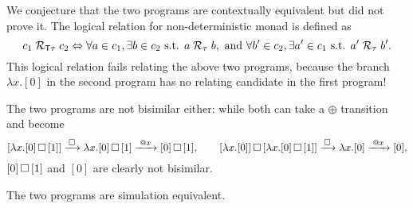 \documentclass[10pt,a4]{article}
\begin{document}
We conjecture that the two programs are contextually equivalent but did not prove it. 
The logical relation for non-deterministic monad is defined as 
\[
c_1 \;\mathcal{R}_{\mathsf{T} \tau}\; c_2 
\Leftrightarrow 
\forall a \in c_1, \exists b \in c_2 \mbox{ s.t. } a \;\mathcal{R}_{\tau}\; b ,
\mbox{ and } 
\forall b' \in c_2, \exists a' \in c_1 \mbox{ s.t. } a' \;\mathcal{R}_{\tau}\; b' .
\]
This logical relation fails relating the above two programs, because the branch $\lambda x. [0]$ 
in the second program has no relating candidate in the first program!


The two programs are not bisimilar either: while both can take a $\oplus$ transition and become
\[
[\lambda x. [0] \,\square\, [1]] \xrightarrow{\,\square\,} \lambda x. [0] \,\square\, [1] 
\xrightarrow{\;@x\;} [0] \,\square\, [1],
\qquad 
[\lambda x. [0]] \,\square\, [\lambda x. [0] \,\square\, [1]] \xrightarrow{\,\square\,} \lambda x. [0]
\xrightarrow{\;@x\;} [0] ,
\]
$[0] \,\square\, [1]$ and $[0]$ are clearly not bisimilar.

The two programs are simulation equivalent.


\end{document}
